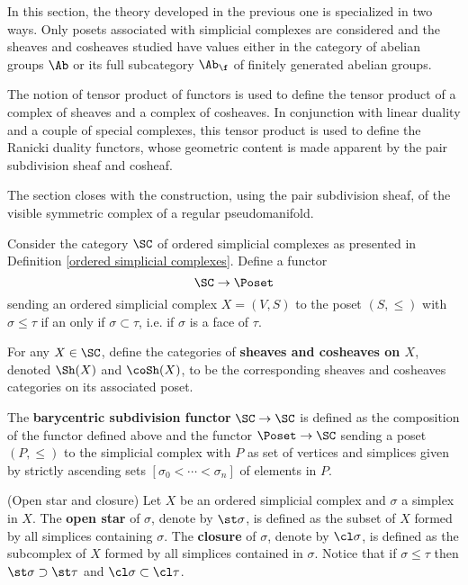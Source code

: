 \documentclass[main.tex]{subfiles}
\begin{document}
In this section, the theory developed in the previous one is specialized in two ways. Only posets associated with simplicial complexes are considered and the sheaves and cosheaves studied have values either in the category of abelian groups $\Ab$ or its full subcategory $\Ab_{\f}$ of finitely generated abelian groups.

The notion of tensor product of functors is used to define the tensor product of a complex of sheaves and a complex of cosheaves. In conjunction with linear duality and a couple of special complexes, this tensor product is used to define the Ranicki duality functors, whose geometric content is made apparent by the pair subdivision sheaf and cosheaf.

The section closes with the construction, using the pair subdivision sheaf, of the visible symmetric complex of a regular pseudomanifold.

\begin{definition}\label{Posets <-- SC}
Consider the category $\SC$ of ordered simplicial complexes as presented in Definition \ref{ordered simplicial complexes}. Define a functor $$\SC\to\Poset$$ sending an ordered simplicial complex $X=(V,S)$ to the poset $(S,\leq)$ with $\sigma\leq\tau$ if an only if $\sigma\subset\tau$, i.e. if $\sigma$ is a face of $\tau$.

For any $X\in\SC$, define the categories of \textbf{sheaves and cosheaves on $X$}, denoted $\Sh(X)$ and $\coSh(X)$, to be the corresponding sheaves and cosheaves categories on its associated poset.

The \textbf{barycentric subdivision functor} $\SC\to\SC$ is defined as the composition of the functor defined above and the functor $\Poset\to\SC$ sending a poset $(P,\leq)$ to the simplicial complex with $P$ as set of vertices and simplices given by strictly ascending sets $[\sigma_0<\dotsb<\sigma_n]$ of elements in $P$.
\end{definition}

\begin{definition}(Open star and closure)
Let $X$ be an ordered simplicial complex and $\sigma$ a simplex in $X$. The \textbf{open star} of $\sigma$, denote by $\st\sigma$, is defined as the subset of $X$ formed by all simplices containing $\sigma$. The \textbf{closure} of $\sigma$, denote by $\cl\sigma$, is defined as the subcomplex of $X$ formed by all simplices contained in $\sigma$. Notice that if $\sigma\leq\tau$ then $\st\sigma\supset\st\tau$ and $\cl\sigma\subset\cl\tau$.
\end{definition}
\end{document}
